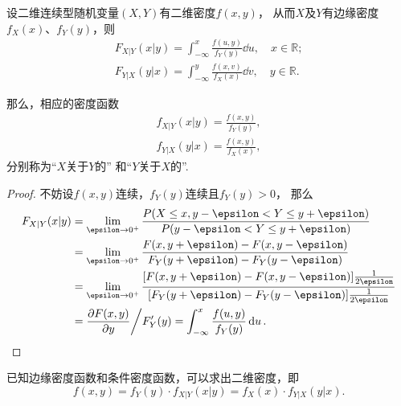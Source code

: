 \begin{theorem}
设二维连续型随机变量\((X,Y)\)有二维密度\(f(x,y)\)，
从而\(X\)及\(Y\)有边缘密度\(f_X(x)\)、\(f_Y(y)\)，则
\begin{align*}
F_{X \vert Y}(x \vert y) = \int_{-\infty}^{x} \frac{f(u,y)}{f_Y(y)}\dd{u}, \quad x \in \mathbb{R}; \\
F_{Y \vert X}(y \vert x) = \int_{-\infty}^{y} \frac{f(x,v)}{f_X(x)}\dd{v}, \quad y \in \mathbb{R}.
\end{align*}

那么，相应的密度函数
\begin{gather}
f_{X \vert Y}(x \vert y) = \frac{f(x,y)}{f_Y(y)}, \label{equation:多维随机变量及其分布.条件密度、联合密度、边缘密度的关系1} \\
f_{Y \vert X}(y \vert x) = \frac{f(x,y)}{f_X(x)}, \label{equation:多维随机变量及其分布.条件密度、联合密度、边缘密度的关系2}
\end{gather}
分别称为“\(X\)关于\(Y\)的”%
和“\(Y\)关于\(X\)的”.
\begin{proof}
不妨设\(f(x,y)\)连续，\(f_Y(y)\)连续且\(f_Y(y)>0\)，
\def\l{\lim\limits_{\epsilon\to0^+}}%
那么\begin{align*}
F_{X \vert Y}(x \vert y)
&= \l \frac{P(X \leq x, y - \epsilon < Y \leq y + \epsilon)}{P(y - \epsilon < Y \leq y + \epsilon)} \\
&= \l \frac{F(x,y+\epsilon) - F(x,y-\epsilon)}{F_Y(y+\epsilon) - F_Y(y-\epsilon)} \\
&= \l \frac{[F(x,y+\epsilon) - F(x,y-\epsilon)] \frac{1}{2 \epsilon}}{[F_Y(y+\epsilon) - F_Y(y-\epsilon)] \frac{1}{2 \epsilon}} \\
&= \pdv{F(x,y)}{y} \bigg/ F_Y'(y)
= \int_{-\infty}^x \frac{f(u,y)}{f_Y(y)} \dd{u}.
\qedhere
\end{align*}
\end{proof}
\end{theorem}

\begin{corollary}
已知边缘密度函数和条件密度函数，可以求出二维密度，即\[
f(x,y) = f_Y(y) \cdot f_{X \vert Y}(x \vert y)
= f_X(x) \cdot f_{Y \vert X}(y \vert x).
\]
\end{corollary}

